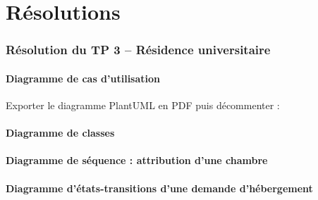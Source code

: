 \documentclass[12pt,a4paper]{article}
\begin{document}
\newpage
\part*{Résolutions}

\section{Résolution du TP 3 -- Résidence universitaire}

\subsection{Diagramme de cas d'utilisation}
 Exporter le diagramme PlantUML en PDF puis décommenter :

\subsection{Diagramme de classes}

\subsection{Diagramme de séquence : attribution d'une chambre}

\subsection{Diagramme d'états-transitions d'une demande d'hébergement}
\end{document}
